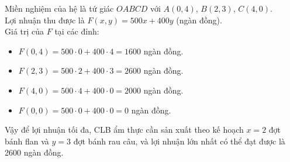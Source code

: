 \begin{bt}
{\begin{center}
		\end{center}
		Miền nghiệm của hệ là tứ giác $OABCD$ với $A(0, 4)$, $B(2, 3)$, $C(4, 0)$.\\
		Lợi nhuận thu được là $F(x, y) = 500x + 400y$ (ngàn đồng).\\
		Giá trị của $F$ tại các đỉnh:
		\begin{itemize}
			\item \( F(0, 4) = 500 \cdot 0 + 400 \cdot 4 = 1600 \) ngàn đồng.
			\item \( F(2, 3) = 500 \cdot 2 + 400 \cdot 3 = 2600 \) ngàn đồng.
			\item \( F(4, 0) = 500 \cdot 4 + 400 \cdot 0 = 2000 \) ngàn đồng.
			\item \( F(0, 0) = 500 \cdot 0 + 400 \cdot 0 = 0 \) ngàn đồng.
		\end{itemize}
		Vậy để lợi nhuận tối đa, CLB ẩm thực cần sản xuất theo kế hoạch \( x = 2 \) đợt bánh flan và \( y = 3 \) đợt bánh rau câu, và lợi nhuận lớn nhất có thể đạt được là 2600 ngàn đồng.
	}
\end{bt}